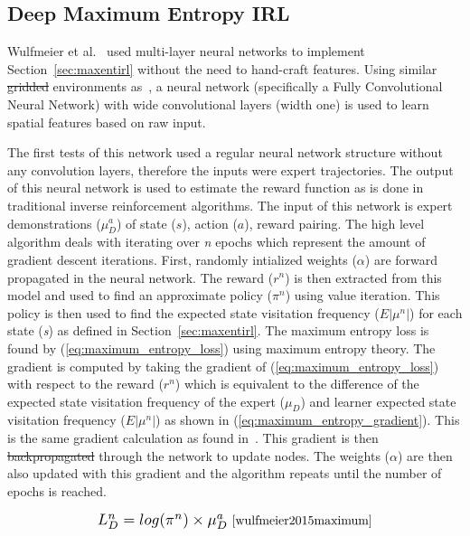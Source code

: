 \documentclass[12pt,american]{report}
\providecommand{\DIFaddtex}[1]{{\protect\color{blue}\uwave{#1}}} %
\providecommand{\DIFdeltex}[1]{{\protect\color{red}\sout{#1}}}                      %
\providecommand{\DIFaddbegin}{} %
\providecommand{\DIFaddend}{} %
\providecommand{\DIFdelbegin}{} %
\providecommand{\DIFdelend}{} %
\providecommand{\DIFadd}[1]{\texorpdfstring{\DIFaddtex{#1}}{#1}} %
\providecommand{\DIFdel}[1]{\texorpdfstring{\DIFdeltex{#1}}{}} %
\newcommand{\DIFscaledelfig}{0.5}
\newlength{\DIFdelgraphicswidth} %
\newlength{\DIFdelgraphicsheight} %
\newcommand{\DIFaddincludegraphics}[2][]{{\color{blue}\fbox{\DIFOincludegraphics[#1]{#2}}}} %
\newcommand{\DIFdelincludegraphics}[2][]{%
\sbox{\DIFdelgraphicsbox}{\DIFOincludegraphics[#1]{#2}}%
\settoboxwidth{\DIFdelgraphicswidth}{\DIFdelgraphicsbox} %
\settoboxtotalheight{\DIFdelgraphicsheight}{\DIFdelgraphicsbox} %
\scalebox{\DIFscaledelfig}{%
\parbox[b]{\DIFdelgraphicswidth}{\usebox{\DIFdelgraphicsbox}\\[-\baselineskip] \rule{\DIFdelgraphicswidth}{0em}}\llap{\resizebox{\DIFdelgraphicswidth}{\DIFdelgraphicsheight}{%
\setlength{\unitlength}{\DIFdelgraphicswidth}%
\begin{picture}(1,1)%
\thicklines\linethickness{2pt} %
{\color[rgb]{1,0,0}\put(0,0){\framebox(1,1){}}}%
{\color[rgb]{1,0,0}\put(0,0){\line( 1,1){1}}}%
{\color[rgb]{1,0,0}\put(0,1){\line(1,-1){1}}}%
\end{picture}%
}\hspace*{3pt}}} %
} %
\DeclareRobustCommand{\DIFaddbegin}{\DIFOaddbegin \let\includegraphics\DIFaddincludegraphics} %
\DeclareRobustCommand{\DIFaddend}{\DIFOaddend \let\includegraphics\DIFOincludegraphics} %
\DeclareRobustCommand{\DIFdelbegin}{\DIFOdelbegin \let\includegraphics\DIFdelincludegraphics} %
\DeclareRobustCommand{\DIFdelend}{\DIFOaddend \let\includegraphics\DIFOincludegraphics} %
\begin{document}
\DIFaddend \label{sec:maxentdeepirl}
\subsection{Deep Maximum Entropy IRL}
Wulfmeier et al.~\cite{wulfmeier2015maximum} used multi-layer neural networks to implement Section~\ref{sec:maxentirl} without the need to hand-craft features. Using similar \DIFdelbegin \DIFdel{gridded }\DIFdelend \DIFaddbegin \DIFadd{grid }\DIFaddend environments as~\cite{ziebart2008maximum}, a neural network (specifically a Fully Convolutional Neural Network) with wide convolutional layers (width one) is used to learn spatial features based on raw input.  

The first tests of this network used a regular neural network structure without any convolution layers, therefore the inputs were expert trajectories. The output of this neural network is used to estimate the reward function as is done in traditional inverse reinforcement algorithms. The input of this network is expert demonstrations ($\mu_{D}^{a}$) of state ($s$), action ($a$), reward pairing. The high level algorithm deals with iterating over \textit{n} epochs which represent the amount of gradient descent iterations. First, randomly intialized weights ($\alpha$) are forward propagated in the neural network.  The reward ($r^n$) is then extracted from this model and used to find an approximate policy ($\pi^n$) using value iteration. This policy is then used to find the expected state visitation frequency ($E|\mu^n|$) for each state (\textit{s}) as defined in Section~\ref{sec:maxentirl}.  The maximum entropy loss is found by (\ref{eq:maximum_entropy_loss}) using maximum entropy theory. The gradient is computed by taking the gradient of (\ref{eq:maximum_entropy_loss}) with respect to the reward ($r^n$) which is equivalent to the difference of the expected state visitation frequency of the expert ($\mu_D$) and learner expected state visitation frequency ($E|\mu^n|$) as shown in (\ref{eq:maximum_entropy_gradient}).  This is the same gradient calculation as found in~\cite{ziebart2008maximum}.  This gradient is then \DIFdelbegin \DIFdel{backpropagated }\DIFdelend \DIFaddbegin \DIFadd{back-propagated }\DIFaddend through the network to update nodes.  The weights ($\alpha$) are then also updated with this gradient and the algorithm repeats until the number of epochs is reached. 

\begin{equation}
            \label{eq:maximum_entropy_loss}
            \resizebox{0.3\textwidth}{!}{$L_{D}^{n}=log(\pi^n) \times \mu_{D}^{a} $}~\cite{wulfmeier2015maximum}%
        \end{equation}
\end{document}
